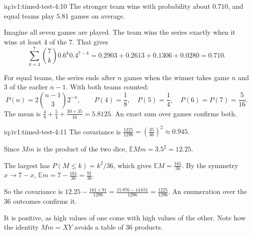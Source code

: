 \begin{solution}{iq:iv1:timed-test-4:10}
The stronger team wins with probability about $0.710$, and equal teams play $5.81$ games on average.

Imagine all seven games are played. The team wins the series exactly when it wins at least 4 of the 7. That gives
\[
\sum_{k = 4}^7\binom7k0.6^k0.4^{7 - k} = 0.2903 + 0.2613 + 0.1306 + 0.0280 = 0.710.
\]

For equal teams, the series ends after $n$ games when the winner takes game $n$ and 3 of the earlier $n - 1$. With both teams counted:
\[
P(n) = 2\binom{n - 1}{3}2^{-n}, \qquad P(4) = \frac18, \quad P(5) = \frac14, \quad P(6) = P(7) = \frac{5}{16}.
\]
The mean is $\frac{4}{8} + \frac{5}{4} + \frac{30 + 35}{16} = 5.8125$. An exact sum over games confirms both.


\end{solution}

\begin{solution}{iq:iv1:timed-test-4:11}
The covariance is $\frac{1225}{1296} = (\frac{35}{36})^2 \approx 0.945$.

Since $Mm$ is the product of the two dice, $\mathbb{E}Mm = 3.5^2 = 12.25$.

The largest has $P(M \le k) = k^2/36$, which gives $\mathbb{E}M = \frac{161}{36}$. By the symmetry $x \to 7 - x$, $\mathbb{E}m = 7 - \frac{161}{36} = \frac{91}{36}$.

So the covariance is $12.25 - \frac{161 \times 91}{1296} = \frac{15\,876 - 14\,651}{1296} = \frac{1225}{1296}$. An enumeration over the 36 outcomes confirms it.

It is positive, as high values of one come with high values of the other. Note how the identity $Mm = XY$ avoids a table of 36 products.

\end{solution}

